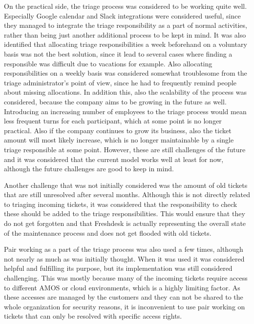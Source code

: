 On the practical side, the triage process was considered to be working quite well. Especially Google calendar and Slack integrations were considered useful, since they managed to integrate the triage responsibility
as a part of normal activities, rather than being just another additional process to be kept in mind. It was also identified that allocating triage responsibilities a week beforehand on a voluntary basis was
not the best solution, since it lead to several cases where finding a responsible was difficult due to vacations for example. Also allocating responsibilities on a weekly basis was considered somewhat troublesome
from the triage administrator's point of view, since he had to frequently remind people about missing allocations. In addition this, also the scalability of the process was considered, because the company aims
to be growing in the future as well. Introducing an increasing number of employees to the triage process would mean less frequent turns for each participant, which at some point is no longer practical.
Also if the company continues to grow its business, also the ticket amount will most likely increase, which is no longer maintainable by a single triage responsible at some point. However, these are still
challenges of the future and it was considered that the current model works well at least for now, although the future challenges are good to keep in mind.

Another challenge that was not initially considered was the amount of old tickets that are still unresolved after several months. Although this is not directly related to triaging incoming tickets, it was
considered that the responsibility to check these should be added to the triage responsibilities. This would ensure that they do not get forgotten and that Freshdesk is actually representing the overall state
of the maintenance process and does not get flooded with old tickets.

Pair working as a part of the triage process was also used a few times, although not nearly as much as was initially thought. When it was used it was considered helpful and fulfilling its purpose, but its
implementation was still considered challenging. This was mostly because many of the incoming tickets require access to different AMOS or cloud environments, which is a highly limiting factor. As these
accesses are managed by the customers and they can not be shared to the whole organization for security reasons, it is inconvenient to use pair working on tickets that can only be resolved with specific access
rights.

